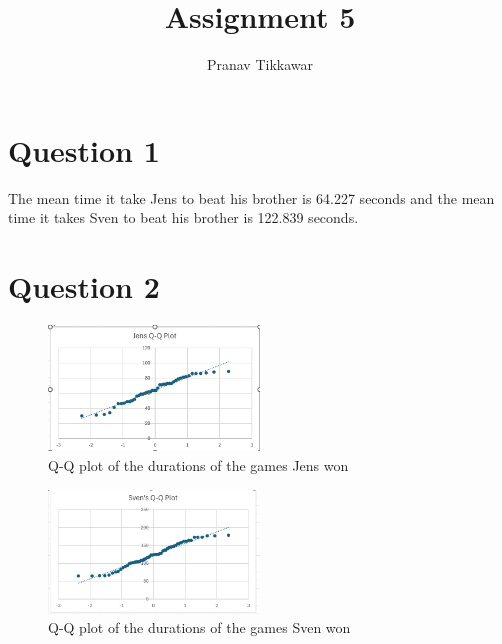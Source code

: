 \documentclass{article}
\author{Pranav Tikkawar}
\title{Assignment 5}
\begin{document}
\maketitle

\section*{Question 1}
The mean time it take Jens to beat his brother is 64.227 seconds and the mean time it takes Sven to beat his brother is 122.839 seconds.

\section*{Question 2}

\begin{figure}[ht]
    \centering
    \includegraphics[width=0.5\textwidth]{A5IMG/JQQ.png}
    \caption{Q-Q plot of the durations of the games Jens won}
    \label{fig:JQQ}
\end{figure}

\begin{figure}[ht]
    \centering
    \includegraphics[width=0.5\textwidth]{A5IMG/SQQ.png}
    \caption{Q-Q plot of the durations of the games Sven won}
    \label{fig:SQQ}
\end{figure}
\end{document}
